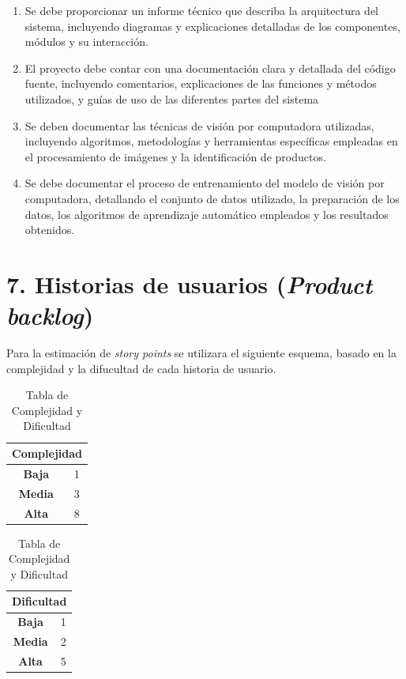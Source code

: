 \documentclass[
11pt, %
codirector, %
]{charter}
\begin{document}
\begin{enumerate}
		\begin{enumerate}
			\item Se debe proporcionar un informe técnico que describa la arquitectura del sistema, incluyendo diagramas y explicaciones detalladas de los componentes, módulos y su interacción.
			\item El proyecto debe contar con una documentación clara y detallada del código fuente, incluyendo comentarios, explicaciones de las funciones y métodos utilizados, y guías de uso de las diferentes partes del sistema
			\item Se deben documentar las técnicas de visión por computadora utilizadas, incluyendo algoritmos, metodologías y herramientas específicas empleadas en el procesamiento de imágenes y la identificación de productos.
			\item Se debe documentar el proceso de entrenamiento del modelo de visión por computadora, detallando el conjunto de datos utilizado, la preparación de los datos, los algoritmos de aprendizaje automático empleados y los resultados obtenidos.
		\end{enumerate}
\end{enumerate}

\section{7. Historias de usuarios (\textit{Product backlog})}
\label{sec:backlog}

Para la estimación de \textit{story points} se utilizara el siguiente esquema, basado en la complejidad y la difucultad de cada historia de usuario.

\begin{table}[ht]
\centering
\caption{Tabla de Complejidad y Dificultad}
\label{tab:tabla}
\begin{tabular}{|c|c|}
\hline
\multicolumn{2}{|c|}{\textbf{Complejidad}} \\ \hline
\textbf{Baja}   & 1                     \\ \hline
\textbf{Media} & 3                     \\ \hline
\textbf{Alta}  & 8                     \\ \hline
\end{tabular}
\quad
\begin{tabular}{|c|c|}
\hline
\multicolumn{2}{|c|}{\textbf{Dificultad}} \\ \hline
\textbf{Baja}   & 1                      \\ \hline
\textbf{Media} & 2                      \\ \hline
\textbf{Alta}  & 5                      \\ \hline
\end{tabular}
\end{table}
\end{document}
